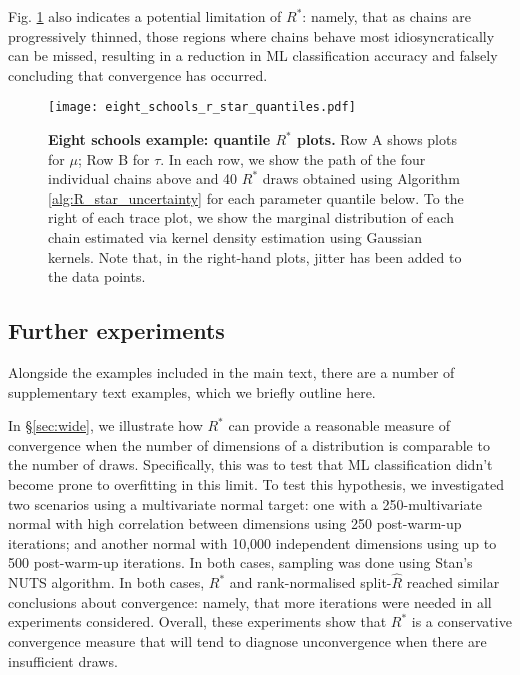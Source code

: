 \documentclass{article}
\begin{document}
Fig. \ref{fig:eight_schools_r_star_quantiles} also indicates a potential limitation of $R^*$: namely, that as chains are progressively thinned, those regions where chains behave most idiosyncratically can be missed, resulting in a reduction in ML classification accuracy and falsely concluding that convergence has occurred.

\begin{figure}[!htb]
	\centerline{\texttt{[image: eight\_schools\_r\_star\_quantiles.pdf]}}
	\caption{\textbf{Eight schools example: quantile $R^*$ plots.} Row A shows plots for $\mu$; Row B for $\tau$. In each row, we show the path of the four individual chains above and 40 $R^*$ draws obtained using Algorithm \ref{alg:R_star_uncertainty} for each parameter quantile below. To the right of each trace plot, we show the marginal distribution of each chain estimated via kernel density estimation using Gaussian kernels. Note that, in the right-hand plots, jitter has been added to the data points.}
	\label{fig:eight_schools_r_star_quantiles}
\end{figure}

\subsection{Further experiments}\label{sec:further_experiments}
Alongside the examples included in the main text, there are a number of supplementary text examples, which we briefly outline here.

In \S\ref{sec:wide}, we illustrate how $R^*$ can provide a reasonable measure of convergence when the number of dimensions of a distribution is comparable to the number of draws. Specifically, this was to test that ML classification didn't become prone to overfitting in this limit. To test this hypothesis, we investigated two scenarios using a multivariate normal target: one with a 250-multivariate normal with high correlation between dimensions using 250 post-warm-up iterations; and another normal with 10,000 independent dimensions using up to 500 post-warm-up iterations. In both cases, sampling was done using Stan's NUTS algorithm. In both cases, $R^*$ and rank-normalised split-$\widehat{R}$ reached similar conclusions about convergence: namely, that more iterations were needed in all experiments considered. Overall, these experiments show that $R^*$ is a conservative convergence measure that will tend to diagnose unconvergence when there are insufficient draws.
\end{document}
